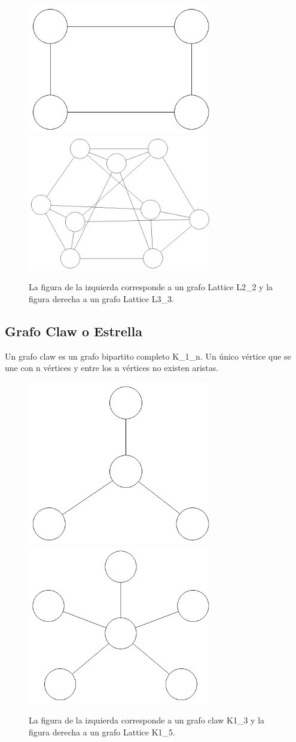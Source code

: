 \begin{figure}[H]
\includegraphics[width=80mm]{L2_2.png}
\includegraphics[width=80mm]{L3_3.png}
\caption{La figura de la izquierda corresponde a un grafo Lattice L2_2 y la figura derecha a un grafo Lattice L3_3.}
\label{overflow}
\end{figure}

\subsection{Grafo Claw o Estrella}
Un grafo claw es un grafo bipartito completo K_1_n. Un único vértice que se une con n vértices y entre los n vértices no existen aristas.

\begin{figure}[H]
\includegraphics[width=80mm]{K1_3.png}
\includegraphics[width=80mm]{K1_5.png}
\caption{La figura de la izquierda corresponde a un grafo claw K1_3 y la figura derecha a un grafo Lattice K1_5.}
\label{overflow}
\end{figure}